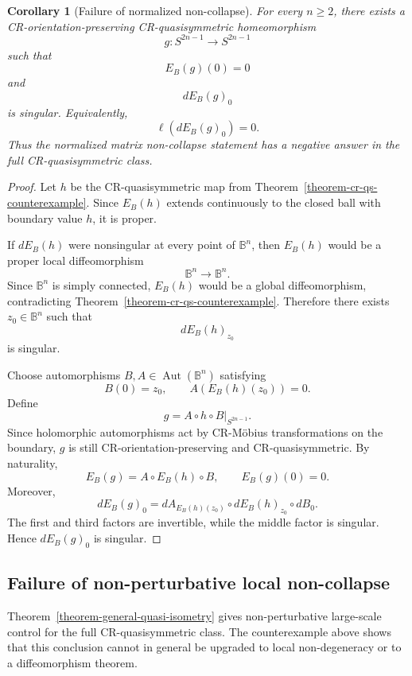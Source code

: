 \documentclass[11pt]{article}
\newtheorem{corollary}[theorem]{Corollary}
\theoremstyle{definition}
\theoremstyle{remark}
\theoremstyle{definition}
\newcommand{\B}{\mathbb B}
\newcommand{\Aut}{\operatorname{Aut}}
\begin{document}
\begin{corollary}[Failure of normalized non-collapse]
\label{corollary-failure-noncollapse}
For every \(n\ge2\), there exists a CR-orientation-preserving
CR-quasisymmetric homeomorphism
\[
        g:S^{2n-1}\to S^{2n-1}
\]
such that
\[
        E_B(g)(0)=0
\]
and
\[
        dE_B(g)_0
\]
is singular.  Equivalently,
\[
        \ell(dE_B(g)_0)=0.
\]
Thus the normalized matrix non-collapse statement has a negative answer in the
full CR-quasisymmetric class.
\end{corollary}

\begin{proof}
Let \(h\) be the CR-quasisymmetric map from
Theorem~\ref{theorem-cr-qs-counterexample}.  Since \(E_B(h)\) extends
continuously to the closed ball with boundary value \(h\), it is proper.

If \(dE_B(h)\) were nonsingular at every point of \(\B^n\), then \(E_B(h)\)
would be a proper local diffeomorphism
\[
        \B^n\to\B^n.
\]
Since \(\B^n\) is simply connected, \(E_B(h)\) would be a global
diffeomorphism, contradicting Theorem~\ref{theorem-cr-qs-counterexample}.
Therefore there exists \(z_0\in\B^n\) such that
\[
        dE_B(h)_{z_0}
\]
is singular.

Choose automorphisms \(B,A\in\Aut(\B^n)\) satisfying
\[
        B(0)=z_0,
        \qquad
        A(E_B(h)(z_0))=0.
\]
Define
\[
        g=A\circ h\circ B|_{S^{2n-1}}.
\]
Since holomorphic automorphisms act by CR-M\"obius transformations on the
boundary, \(g\) is still CR-orientation-preserving and CR-quasisymmetric.  By
naturality,
\[
        E_B(g)=A\circ E_B(h)\circ B,
        \qquad
        E_B(g)(0)=0.
\]
Moreover,
\[
        dE_B(g)_0
        =
        dA_{E_B(h)(z_0)}
        \circ
        dE_B(h)_{z_0}
        \circ
        dB_0.
\]
The first and third factors are invertible, while the middle factor is
singular.  Hence \(dE_B(g)_0\) is singular.
\end{proof}


\subsection{Failure of non-perturbative local non-collapse}
\label{section-failure-nonperturbative}

Theorem~\ref{theorem-general-quasi-isometry} gives non-perturbative
large-scale control for the full CR-quasisymmetric class.  The counterexample
above shows that this conclusion cannot in general be upgraded to local
non-degeneracy or to a diffeomorphism theorem.
\end{document}
